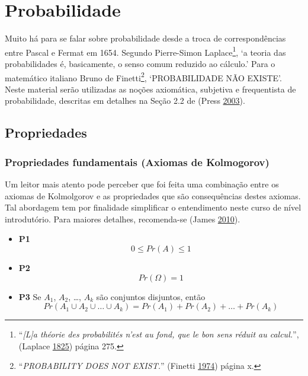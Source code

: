 \documentclass[
]{book}
\providecommand{\tightlist}{%
  \setlength{\itemsep}{0pt}\setlength{\parskip}{0pt}}
\theoremstyle{definition}
\theoremstyle{definition}
\theoremstyle{definition}
\theoremstyle{remark}
\begin{document}
\hypertarget{probabilidade}{%
\chapter{Probabilidade}\label{probabilidade}}

Muito há para se falar sobre probabilidade desde a troca de correspondências entre Pascal e Fermat em 1654. Segundo Pierre-Simon Laplace\footnote{``\emph{{[}L{]}a théorie des probabilités n'est au fond, que le bon sens réduit au calcul.}'', (Laplace \protect\hyperlink{ref-laplace1825essai}{1825}) página 275.}, `a teoria das probabilidades é, basicamente, o senso comum reduzido ao cálculo.' Para o matemático italiano Bruno de Finetti\footnote{``\emph{PROBABILITY DOES NOT EXIST.}'' (Finetti \protect\hyperlink{ref-definetti1974theory}{1974}) página x.}, `PROBABILIDADE NÃO EXISTE'. Neste material serão utilizadas as noções axiomática, subjetiva e frequentista de probabilidade, descritas em detalhes na Seção 2.2 de (Press \protect\hyperlink{ref-press2003subjective}{2003}).

\hypertarget{propriedades}{%
\section{Propriedades}\label{propriedades}}

\hypertarget{propriedades-fundamentais-axiomas-de-kolmogorov}{%
\subsection{Propriedades fundamentais (Axiomas de Kolmogorov)}\label{propriedades-fundamentais-axiomas-de-kolmogorov}}

Um leitor mais atento pode perceber que foi feita uma combinação entre os axiomas de Kolmolgorov e as propriedades que são consequências destes axiomas. Tal abordagem tem por finalidade simplificar o entendimento neste curso de nível introdutório. Para maiores detalhes, recomenda-se (James \protect\hyperlink{ref-james2010probabilidade}{2010}).

\begin{itemize}
\tightlist
\item
  \textbf{P1}\\
  \begin{equation}
  0 \le Pr(A) \le 1 
  \label{eq:def-p1}
  \end{equation}
\item
  \textbf{P2}\\
  \begin{equation}
  Pr(\Omega)=1 
  \label{eq:def-p2}
  \end{equation}
\item
  \textbf{P3} Se \(A_1\), \(A_2\), \ldots, \(A_k\) são conjuntos disjuntos, então
  \begin{equation}
  Pr(A_1 \cup A_2 \cup \ldots \cup A_k) = Pr(A_1) + Pr(A_2) + \ldots + Pr(A_k)
  \label{eq:def-p3}
  \end{equation}
\end{itemize}
\end{document}
